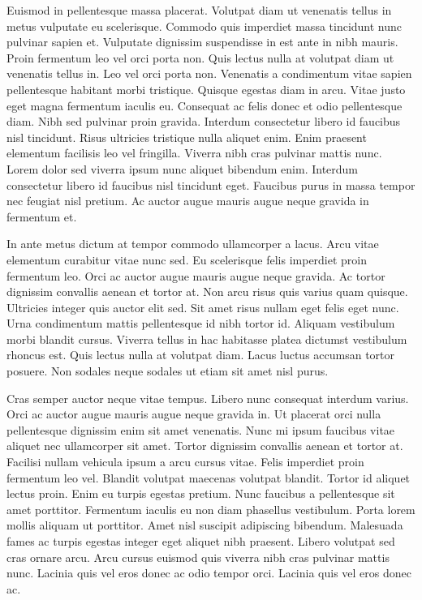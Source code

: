 \documentclass[
]{scrbook}
\begin{document}
Euismod in pellentesque massa placerat. Volutpat diam ut venenatis tellus in metus vulputate eu scelerisque. Commodo quis imperdiet massa tincidunt nunc pulvinar sapien et. Vulputate dignissim suspendisse in est ante in nibh mauris. Proin fermentum leo vel orci porta non. Quis lectus nulla at volutpat diam ut venenatis tellus in. Leo vel orci porta non. Venenatis a condimentum vitae sapien pellentesque habitant morbi tristique. Quisque egestas diam in arcu. Vitae justo eget magna fermentum iaculis eu. Consequat ac felis donec et odio pellentesque diam. Nibh sed pulvinar proin gravida. Interdum consectetur libero id faucibus nisl tincidunt. Risus ultricies tristique nulla aliquet enim. Enim praesent elementum facilisis leo vel fringilla. Viverra nibh cras pulvinar mattis nunc. Lorem dolor sed viverra ipsum nunc aliquet bibendum enim. Interdum consectetur libero id faucibus nisl tincidunt eget. Faucibus purus in massa tempor nec feugiat nisl pretium. Ac auctor augue mauris augue neque gravida in fermentum et.

In ante metus dictum at tempor commodo ullamcorper a lacus. Arcu vitae elementum curabitur vitae nunc sed. Eu scelerisque felis imperdiet proin fermentum leo. Orci ac auctor augue mauris augue neque gravida. Ac tortor dignissim convallis aenean et tortor at. Non arcu risus quis varius quam quisque. Ultricies integer quis auctor elit sed. Sit amet risus nullam eget felis eget nunc. Urna condimentum mattis pellentesque id nibh tortor id. Aliquam vestibulum morbi blandit cursus. Viverra tellus in hac habitasse platea dictumst vestibulum rhoncus est. Quis lectus nulla at volutpat diam. Lacus luctus accumsan tortor posuere. Non sodales neque sodales ut etiam sit amet nisl purus.

Cras semper auctor neque vitae tempus. Libero nunc consequat interdum varius. Orci ac auctor augue mauris augue neque gravida in. Ut placerat orci nulla pellentesque dignissim enim sit amet venenatis. Nunc mi ipsum faucibus vitae aliquet nec ullamcorper sit amet. Tortor dignissim convallis aenean et tortor at. Facilisi nullam vehicula ipsum a arcu cursus vitae. Felis imperdiet proin fermentum leo vel. Blandit volutpat maecenas volutpat blandit. Tortor id aliquet lectus proin. Enim eu turpis egestas pretium. Nunc faucibus a pellentesque sit amet porttitor. Fermentum iaculis eu non diam phasellus vestibulum. Porta lorem mollis aliquam ut porttitor. Amet nisl suscipit adipiscing bibendum. Malesuada fames ac turpis egestas integer eget aliquet nibh praesent. Libero volutpat sed cras ornare arcu. Arcu cursus euismod quis viverra nibh cras pulvinar mattis nunc. Lacinia quis vel eros donec ac odio tempor orci. Lacinia quis vel eros donec ac.
\end{document}

